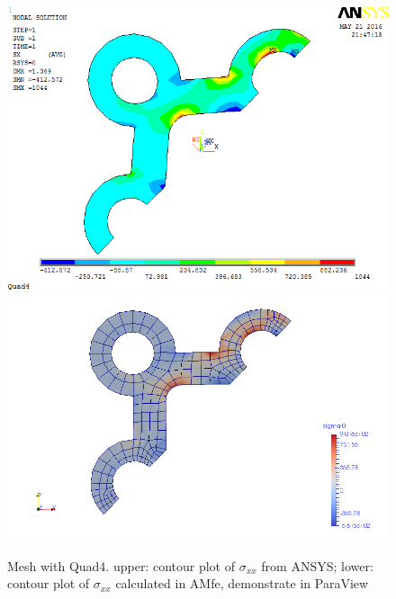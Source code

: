 \begin{figure}[htbp]
	\begin{center}
		\includegraphics[width=13cm,clip]{Quad4_Sxx.png} 		
		\includegraphics[width=13cm,clip]{Quad4_Sxx_P.png} 		
		\caption{Mesh with Quad4. upper: contour plot of $\sigma_{xx}$ from ANSYS; lower: contour plot of $\sigma_{xx}$ calculated in AMfe, demonstrate in ParaView} \label{fig: Quad4_Sxx}
	\end{center}
\end{figure}

